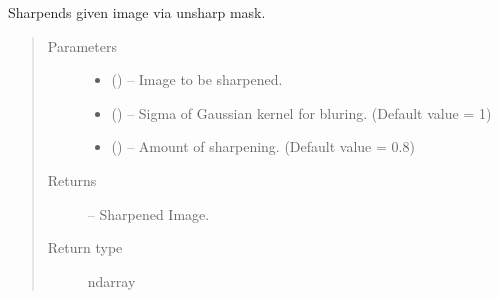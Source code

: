 \documentclass[letterpaper,10pt,english]{sphinxmanual}
\begin{document}
\begin{fulllineitems}
\label{\detokenize{image_helpers:image_helpers.unsharp_mask}}
Sharpends given image via unsharp mask.
\begin{quote}\begin{description}
\item[{Parameters}] \leavevmode\begin{itemize}
\item {} 
 () -- Image to be sharpened.

\item {} 
 () -- Sigma of Gaussian kernel for bluring. (Default value = 1)

\item {} 
 () -- Amount of sharpening. (Default value = 0.8)

\end{itemize}

\item[{Returns}] \leavevmode
{} -- Sharpened Image.

\item[{Return type}] \leavevmode
ndarray

\end{description}\end{quote}

\end{fulllineitems}


\begin{fulllineitems}
\label{\detokenize{image_helpers:image_helpers.vprint}}
\end{fulllineitems}

\end{document}
